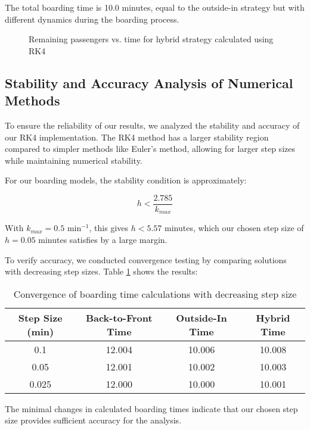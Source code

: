 The total boarding time is 10.0 minutes, equal to the outside-in strategy but with different dynamics during the boarding process.

\begin{figure}[h]
\centering
\caption{Remaining passengers vs. time for hybrid strategy calculated using RK4}
\label{fig:hybrid_rk4}
\end{figure}

\subsection{Stability and Accuracy Analysis of Numerical Methods}

To ensure the reliability of our results, we analyzed the stability and accuracy of our RK4 implementation. The RK4 method has a larger stability region compared to simpler methods like Euler's method, allowing for larger step sizes while maintaining numerical stability.

For our boarding models, the stability condition is approximately:

\begin{equation}
h < \frac{2.785}{k_{max}}
\end{equation}

With $k_{max} = 0.5$ min$^{-1}$, this gives $h < 5.57$ minutes, which our chosen step size of $h = 0.05$ minutes satisfies by a large margin.

To verify accuracy, we conducted convergence testing by comparing solutions with decreasing step sizes. Table \ref{tab:convergence} shows the results:

\begin{table}[h]
\centering
\begin{tabular}{|c|c|c|c|}
\hline
\textbf{Step Size (min)} & \textbf{Back-to-Front Time} & \textbf{Outside-In Time} & \textbf{Hybrid Time} \\
\hline
0.1 & 12.004 & 10.006 & 10.008 \\
\hline
0.05 & 12.001 & 10.002 & 10.003 \\
\hline
0.025 & 12.000 & 10.000 & 10.001 \\
\hline
\end{tabular}
\caption{Convergence of boarding time calculations with decreasing step size}
\label{tab:convergence}
\end{table}

The minimal changes in calculated boarding times indicate that our chosen step size provides sufficient accuracy for the analysis.

